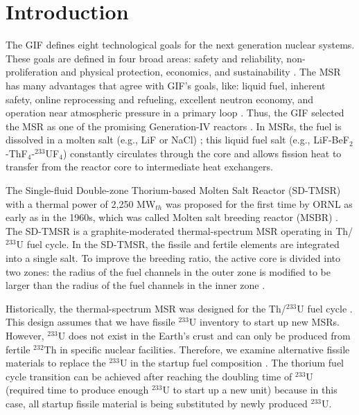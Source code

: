 \section{Introduction} \label{Introduction}
The \gls{GIF} defines eight technological goals for the next generation
nuclear systems. These goals are defined in four broad areas: safety and reliability, non-proliferation and physical protection, economics, and sustainability \cite{doe2002technology}. The \gls{MSR} has many advantages that agree
with \gls{GIF}'s goals, like: liquid fuel, inherent safety, online
reprocessing and refueling, excellent neutron economy, and operation near
atmospheric
pressure in a primary loop \cite{siemer2015molten,rosenthal1970molten}.
Thus, the \gls{GIF} selected the \gls{MSR} as one of the promising Generation-IV
reactors \cite{doe2002technology,pioro2016handbook}.
In \glspl{MSR}, the fuel is dissolved in a molten salt (e.g., LiF or NaCl) \cite{betzler_impacts_2019};
this liquid fuel salt (e.g., LiF-BeF$_2$-ThF$_4$-$^{233}$UF$_4$) constantly
circulates through the core and allows fission heat to transfer from the reactor
core to intermediate heat exchangers.

The Single-fluid Double-zone Thorium-based Molten Salt Reactor (SD-TMSR) with a thermal power of 2,250
MW$_{th}$ was proposed for the first time by ORNL as early as in the 1960s, which was called Molten salt breeding reactor (MSBR) \cite{robertson_conceptual_1971}.
The SD-TMSR is a graphite-moderated thermal-spectrum \gls{MSR} operating in Th/$^{233}$U
fuel cycle. In the SD-TMSR, the fissile and fertile elements are integrated
into a single salt. To improve the breeding ratio, the active core is divided into two zones:
the radius of the fuel channels in the outer zone is modified to be larger
than the radius of the fuel channels in the inner zone \cite{li_optimization_2018}.

Historically, the thermal-spectrum \gls{MSR} was designed for the Th/$^{233}$U
fuel cycle \cite{rykhlevskii2019modeling,nuttin2005potential,
	merle2004scenarios,rosenthal1970molten}. This design assumes that we have
fissile $^{233}$U inventory to start up new \glspl{MSR}. However, $^{233}$U does not
exist in the Earth's crust and can only be produced from fertile $^{232}$Th in 
specific nuclear facilities. Therefore, we examine alternative fissile
materials to replace the $^{233}$U in the startup fuel
composition \cite{betzler2016modeling,zou2018transition}. The thorium fuel
cycle transition can be achieved after reaching the doubling
time of $^{233}$U (required time to produce enough $^{233}$U to start up a new unit) because in this case, all startup fissile material
is being substituted by newly produced $^{233}$U.

